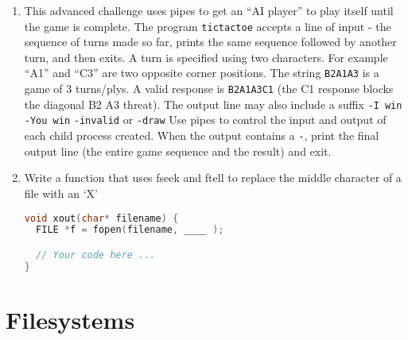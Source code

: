 \begin{enumerate}
\item This advanced challenge uses pipes to get an ``AI player'' to play itself until the game is complete. The program \texttt{tictactoe} accepts a line of input - the sequence of turns made so far, prints the same sequence followed by another turn, and then exits. A turn is specified using two characters. For example ``A1'' and ``C3'' are two opposite corner positions. The string \texttt{B2A1A3} is a game of 3 turns/plys. A valid response is \texttt{B2A1A3C1} (the C1 response blocks the diagonal B2 A3 threat). The output line may also include a suffix \texttt{-I\ win} \texttt{-You\ win} \texttt{-invalid} or \texttt{-draw} Use pipes to control the input and output of each child process created. When the output contains a \texttt{-}, print the final output line (the entire game sequence and the result) and exit.

\item Write a function that uses fseek and ftell to replace the middle character of a file with an `X'

\begin{lstlisting}[language=C]
void xout(char* filename) {
  FILE *f = fopen(filename, ____ );

  // Your code here ...
}
\end{lstlisting}

\end{enumerate}

\section{Filesystems}

